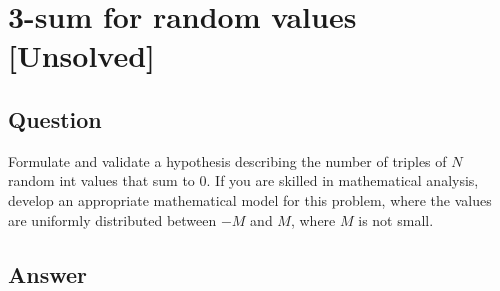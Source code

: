 \section{3-sum for random values [Unsolved]}

\subsection*{Question}
Formulate and validate a hypothesis describing the
number of triples of $N$ random int values that sum to 0.
If you are skilled in mathematical analysis, develop an
appropriate mathematical model for this problem, where
the values are uniformly distributed between $-M$ and $M$,
where $M$ is not small.

\subsection*{Answer}
